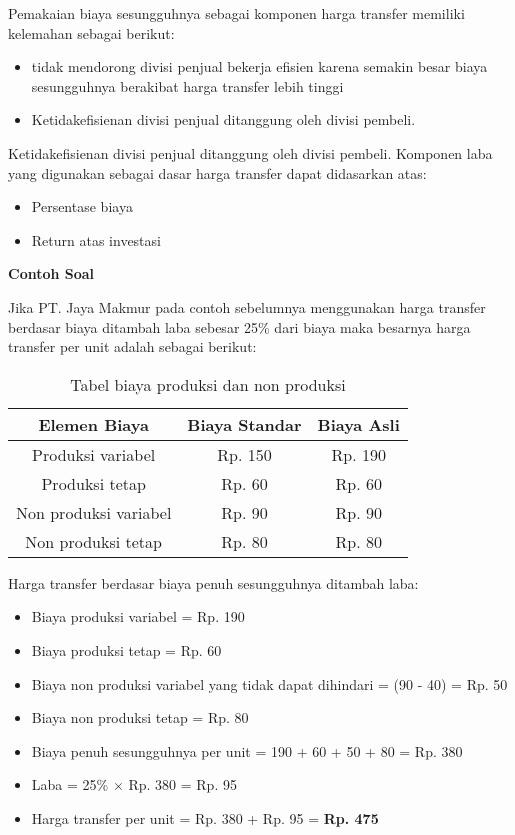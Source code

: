 \begin{enumerate}
	Pemakaian biaya sesungguhnya sebagai komponen harga transfer memiliki kelemahan sebagai berikut:

	\begin{itemize}
		\item tidak mendorong divisi penjual bekerja efisien karena semakin besar biaya sesungguhnya berakibat harga transfer lebih tinggi
		\item Ketidakefisienan divisi penjual ditanggung oleh divisi pembeli.
	\end{itemize}

	Ketidakefisienan divisi penjual ditanggung oleh divisi pembeli. Komponen laba yang digunakan sebagai dasar harga transfer dapat didasarkan atas:

	\begin{itemize}
		\item Persentase biaya
		\item Return atas investasi
	\end{itemize}

	\textbf{Contoh Soal}

	Jika PT. Jaya Makmur pada contoh sebelumnya menggunakan harga transfer berdasar biaya ditambah laba sebesar 25\% dari biaya maka besarnya harga transfer per unit adalah sebagai berikut:
	
	\begin{table}[H]	
		\begin{center}
			\caption{Tabel biaya produksi dan non produksi}
			\label{tab:table4}
			\begin{tabular}{c|c|c} %
			\textbf{Elemen Biaya} & \textbf{Biaya Standar} & \textbf{Biaya Asli} \\
			\hline
			Produksi variabel & Rp. 150 & Rp. 190 \\
			Produksi tetap & Rp. 60 & Rp. 60 \\
			Non produksi variabel &  Rp. 90 & Rp. 90 \\
			Non produksi tetap & Rp. 80 & Rp. 80 \\
			\end{tabular}
		\end{center}
	\end{table}

	Harga transfer berdasar biaya penuh sesungguhnya ditambah laba:

	\begin{itemize}
		\item Biaya produksi variabel = Rp. 190
		\item Biaya produksi tetap = Rp. 60
		\item Biaya non produksi variabel yang tidak dapat dihindari = (90 - 40) = Rp. 50
		\item Biaya non produksi tetap = Rp. 80
		\item Biaya penuh sesungguhnya per unit = 190 + 60 + 50 + 80 = Rp. 380
		\item Laba = 25\% $\times$ Rp. 380 = Rp. 95
		\item Harga transfer per unit = Rp. 380 + Rp. 95 = \textbf{Rp. 475}
	\end{itemize}


\end{enumerate}
